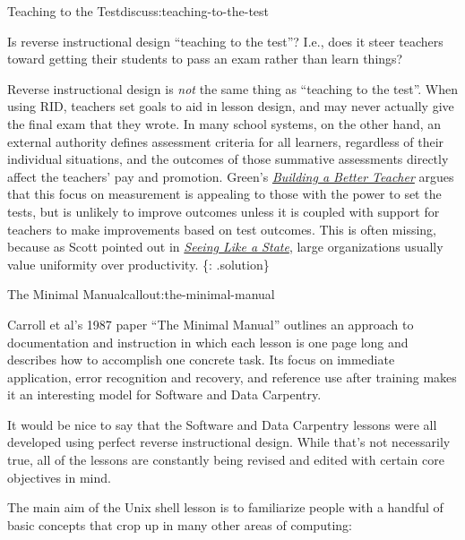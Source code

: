 \begin{discussion}{Teaching to the Test}{discuss:teaching-to-the-test}

Is reverse instructional design ``teaching to the test''? I.e., does it
steer teachers toward getting their students to pass an exam rather than
learn things?

Reverse instructional design is \emph{not} the same thing as ``teaching
to the test''. When using RID, teachers set goals to aid in lesson
design, and may never actually give the final exam that they wrote. In
many school systems, on the other hand, an external authority defines
assessment criteria for all learners, regardless of their individual
situations, and the outcomes of those summative assessments directly
affect the teachers' pay and promotion. Green's
\emph{\href{http://www.amazon.com/Building-Better-Teacher-Teaching-Everyone/dp/0393351084/}{Building
a Better Teacher}} argues that this focus on measurement is appealing to
those with the power to set the tests, but is unlikely to improve
outcomes unless it is coupled with support for teachers to make
improvements based on test outcomes. This is often missing, because as
Scott pointed out in
\emph{\href{http://www.amazon.com/Seeing-like-State-Certain-Condition/dp/0300078153/}{Seeing
Like a State}}, large organizations usually value uniformity over
productivity. \{: .solution\}
\end{discussion}

\begin{callout}{The Minimal Manual}{callout:the-minimal-manual}

Carroll et al's 1987 paper
``The Minimal Manual'' \cite{bib:carroll-minimal-manual}
outlines an approach to documentation and instruction
in which each lesson is one page long and describes how to accomplish
one concrete task. Its focus on immediate application, error recognition
and recovery, and reference use after training makes it an interesting
model for Software and Data Carpentry.
\end{callout}


It would be nice to say that the Software and Data Carpentry lessons
were all developed using perfect reverse instructional design. While
that's not necessarily true, all of the lessons are constantly being
revised and edited with certain core objectives in mind.

The main aim of the Unix shell lesson is to familiarize people with a
handful of basic concepts that crop up in many other areas of computing:

